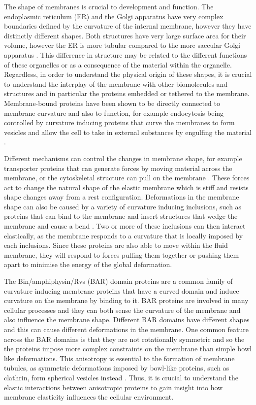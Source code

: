 The shape of membranes is crucial to development and function. The endoplasmic reticulum (ER) and the Golgi apparatus have very complex boundaries defined by the curvature of the internal membrane, however they have distinctly different shapes. Both structures have very large surface area for their volume, however the ER is more tubular compared to the more saccular Golgi apparatus \cite{zimmerberg_how_2006}. This difference in structure may be related to the different functions of these organelles or as a consequence of the material within the organelle. Regardless, in order to understand the physical origin of these shapes, it is crucial to understand the interplay of the membrane with other biomolecules and structures and in particular the proteins embedded or tethered to the membrane. Membrane-bound proteins have been shown to be directly connected to membrane curvature and also to function, for example endocytosis being controlled by curvature inducing proteins that curve the membranes to form vesicles and allow the cell to take in external substances by engulfing the material \cite{boucrot_endophilin_2015}.

Different mechanisms can control the changes in membrane shape, for example transporter proteins that can generate forces by moving material across the membrane, or the cytoskeletal structure can pull on the membrane \cite{ghosh_pattern_2021}. These forces act to change the natural shape of the elastic membrane which  is stiff and resists shape changes away from a rest configuration. Deformations in the membrane shape can also be caused by a variety of curvature inducing inclusions, such as proteins that can bind to the membrane and insert structures that wedge the membrane and cause a bend \cite{simunovic_when_2015, argudo_continuum_2016}. Two or more of these inclusions can then interact elastically, as the membrane responds to a curvature that is locally imposed by each inclusions. Since these proteins are also able to move within the fluid membrane, they will respond to forces pulling them together or pushing them apart to minimise the energy of the global deformation.

The Bin/amphiphysin/Rvs (BAR) domain proteins are a common family of curvature inducing membrane proteins that have a curved domain and induce curvature on the membrane by binding to it. BAR proteins are involved in many cellular processes and they can both sense the curvature of the membrane and also influence the membrane shape. Different BAR domains have different shapes and this can cause different deformations in the membrane. One common feature across the BAR domains is that they are not rotationally symmetric and so the the proteins impose more complex constraints on the membrane than simple bowl like deformations. This anisotropy is essential to the formation of membrane tubules, as symmetric deformations imposed by bowl-like proteins, such as clathrin, form spherical vesicles instead \cite{simunovic_when_2015}. Thus, it is crucial to understand the elastic interactions between anisotropic proteins to gain insight into how membrane elasticity influences the cellular environment.

